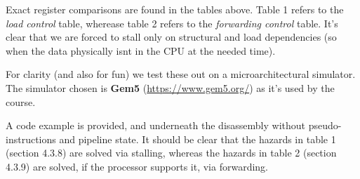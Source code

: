 \documentclass[a4paper,11pt]{article}
\begin{document}
Exact register comparisons are found in the tables above.
Table 1 refers to the \textit{load control} table, wherease table 2 refers to the \textit{forwarding control} table.
It's clear that we are forced to stall only on structural and load dependencies (so when the data physically isnt in the CPU at the needed time).

\par\smallskip

For clarity (and also for fun) we test these out on a microarchitectural simulator.
The simulator chosen is \textbf{Gem5} (\url{https://www.gem5.org/}) as it's used by the course.

A code example is provided, and underneath the disassembly without pseudo-instructions and pipeline state.
It should be clear that the hazards in table 1 (section 4.3.8) are solved via stalling, whereas the hazards in table 2 (section 4.3.9) are solved, if the processor supports it, via forwarding.
\end{document}
